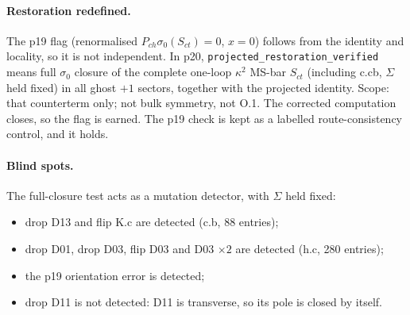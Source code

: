 \paragraph{Restoration redefined.} The p19 flag (renormalised $P_{ch}\sigma_0(S_{ct})=0$, $x=0$) follows from the
identity and locality, so it is not independent. In p20, \texttt{projected\_restoration\_verified} means full
$\sigma_0$ closure of the complete one-loop $\kappa^2$ MS-bar $S_{ct}$ (including c.cb, $\Sigma$ held fixed) in all
ghost $+1$ sectors, together with the projected identity. Scope: that counterterm only; not bulk symmetry, not O.1.
The corrected computation closes, so the flag is earned. The p19 check is kept as a labelled route-consistency
control, and it holds.

\paragraph{Blind spots.} The full-closure test acts as a mutation detector, with $\Sigma$ held fixed:
\begin{itemize}
\item drop D13 and flip K.c are detected (c.b, 88 entries);
\item drop D01, drop D03, flip D03 and D03 $\times2$ are detected (h.c, 280 entries);
\item the p19 orientation error is detected;
\item drop D11 is not detected: D11 is transverse, so its pole is closed by itself.
\end{itemize}

